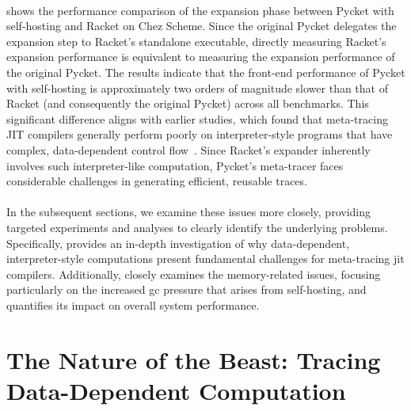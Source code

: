 			\paragraph{}%
				 shows the performance comparison of the expansion phase between Pycket with self-hosting and Racket on Chez Scheme. Since the original Pycket delegates the expansion step to Racket's standalone executable, directly measuring Racket's expansion performance is equivalent to measuring the expansion performance of the original Pycket. The results indicate that the front-end performance of Pycket with self-hosting is approximately two orders of magnitude slower than that of Racket (and consequently the original Pycket) across all benchmarks. This significant difference aligns with earlier studies, which found that meta-tracing JIT compilers generally perform poorly on interpreter-style programs that have complex, data-dependent control flow~\cite{pycketmain,bolzPhDThesis}. Since Racket's expander inherently involves such interpreter-like computation, Pycket's meta-tracer faces considerable challenges in generating efficient, reusable traces.

			\paragraph{}%
				In the subsequent sections, we examine these issues more closely, providing targeted experiments and analyses to clearly identify the underlying problems. Specifically,  provides an in-depth investigation of why data-dependent, interpreter-style computations present fundamental challenges for meta-tracing \gls{jit} compilers. Additionally,  closely examines the memory-related issues, focusing particularly on the increased \gls{gc} pressure that arises from self-hosting, and quantifies its impact on overall system performance.



	\section[\texorpdfstring{The Nature of the Beast: Tracing Data-Dependent Computation}{The Nature of the Beast}]{The Nature of the Beast: Tracing Data-Dependent Computation}
	\label{section:nature-of-the-beast}

